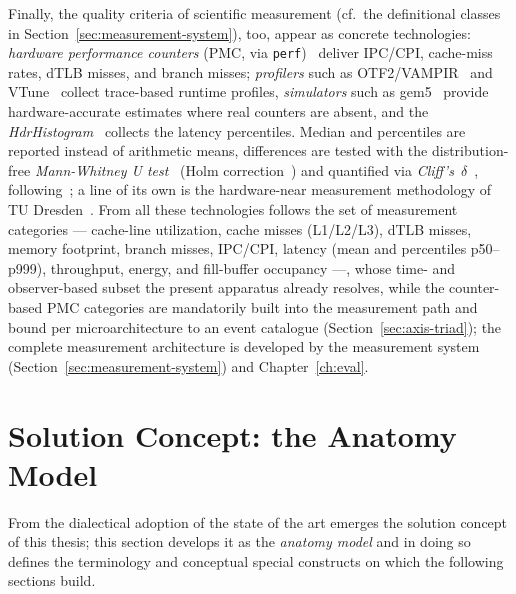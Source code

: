 \begin{nurkurz}
Finally, the quality criteria of scientific measurement (cf.\ the definitional classes in
Section~\ref{sec:measurement-system}), too, appear as concrete technologies: \emph{hardware performance
counters} (PMC, via \texttt{perf})~\cite{demelo2010perf} deliver IPC/CPI, cache-miss rates, dTLB misses, and
branch misses; \emph{profilers} such as OTF2/VAMPIR~\cite{berthold2023vampir} and
VTune~\cite{reinders2005vtune} collect trace-based runtime profiles, \emph{simulators} such as
gem5~\cite{binkert2011gem5} provide hardware-accurate estimates where real counters are absent, and the
\emph{HdrHistogram}~\cite{tene_hdrhistogram} collects the latency percentiles. Median and percentiles are
reported instead of arithmetic means, differences are tested with the distribution-free \emph{Mann-Whitney U
test}~\cite{mann1947utest} (Holm correction~\cite{holm1979sequential}) and quantified via
\emph{Cliff's~$\delta$}~\cite{cliff1993dominance}, following~\cite{hoefler2015benchmarking}; a line of its
own is the hardware-near measurement methodology of TU
Dresden~\cite{ungethuem2017survey,schmidt2025hbm,berthold2023vampir}. From all these technologies follows
the set of measurement categories --- cache-line utilization, cache misses (L1/L2/L3), dTLB misses, memory
footprint, branch misses, IPC/CPI, latency (mean and percentiles p50--p999), throughput, energy, and
fill-buffer occupancy ---, whose time- and observer-based subset the present apparatus already resolves,
while the counter-based PMC categories are mandatorily built into the measurement path and bound per
microarchitecture to an event catalogue (Section~\ref{sec:axis-triad}); the complete measurement
architecture is developed by the measurement system (Section~\ref{sec:measurement-system}) and
Chapter~\ref{ch:eval}.
\end{nurkurz}

\section{Solution Concept: the Anatomy Model}\label{sec:anatomy-model}
From the dialectical adoption of the state of the art emerges the solution concept of this thesis;
this section develops it as the \emph{anatomy model} and in doing so defines the terminology and
conceptual special constructs on which the following sections build.

